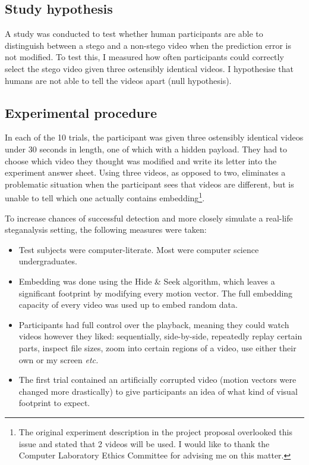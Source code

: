 \documentclass[12pt,british,twoside,notitlepage,usenames,dvipsnames,hypens,final]{report}
\numberwithin{equation}{section}
\numberwithin{figure}{section}
\begin{document}
\subsection{Study hypothesis}

A study was conducted to test whether human participants are able to distinguish between a stego and a non-stego video when the prediction error is not modified. To test this, I measured how often participants could correctly select the stego video given three ostensibly identical videos. I hypothesise that humans are not able to tell the videos apart (null hypothesis).

\subsection{Experimental procedure}

In each of the 10 trials, the participant was given three ostensibly identical videos under 30 seconds in length, one of which with a hidden payload. They had to choose which video they thought was modified and write its letter into the experiment answer sheet. Using three videos, as opposed to two, eliminates a problematic situation when the participant sees that videos are different, but is unable to tell which one actually contains embedding\footnote{The original experiment description in the project proposal overlooked this issue and stated that 2 videos will be used. I would like to thank the Computer Laboratory Ethics Committee for advising me on this matter.}.

To increase chances of successful detection and more closely simulate a real-life steganalysis setting, the following measures were taken:
\begin{itemize}
\item Test subjects were computer-literate. Most were computer science undergraduates.
\item Embedding was done using the Hide \& Seek algorithm, which leaves a significant footprint by modifying every motion vector. The full embedding capacity of every video was used up to embed random data.  
\item Participants had full control over the playback, meaning they could watch videos however they liked: sequentially, side-by-side, repeatedly replay certain parts, inspect file sizes, zoom into certain regions of a video, use either their own or my screen \emph{etc.}
\item The first trial contained an artificially corrupted video (motion vectors were changed more drastically) to give participants an idea of what kind of visual footprint to expect. 
\end{itemize} 
\end{document}

